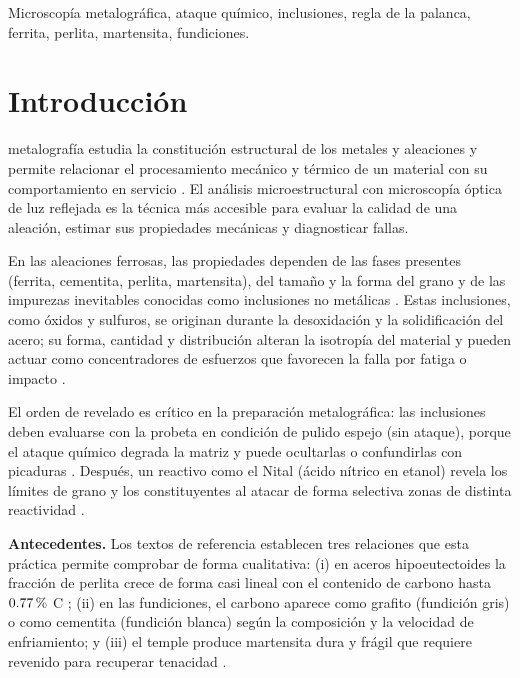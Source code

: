 \documentclass[journal,11pt]{IEEEtran}
\newcommand{\pct}{\ifmmode\mskip\thinmuskip\mathchar"0025\relax\else\,\char37\relax\fi}
\begin{document}
\begin{IEEEkeywords}
Microscopía metalográfica, ataque químico, inclusiones, regla de la palanca, ferrita, perlita, martensita, fundiciones.
\end{IEEEkeywords}

\section{Introducción}
 metalografía estudia la constitución estructural de los metales y aleaciones y permite relacionar el procesamiento mecánico y térmico de un material con su comportamiento en servicio \cite{smith}. El análisis microestructural con microscopía óptica de luz reflejada es la técnica más accesible para evaluar la calidad de una aleación, estimar sus propiedades mecánicas y diagnosticar fallas.

En las aleaciones ferrosas, las propiedades dependen de las fases presentes (ferrita, cementita, perlita, martensita), del tamaño y la forma del grano y de las impurezas inevitables conocidas como inclusiones no metálicas \cite{callister}. Estas inclusiones, como óxidos y sulfuros, se originan durante la desoxidación y la solidificación del acero; su forma, cantidad y distribución alteran la isotropía del material y pueden actuar como concentradores de esfuerzos que favorecen la falla por fatiga o impacto \cite{ashby2}.

El orden de revelado es crítico en la preparación metalográfica: las inclusiones deben evaluarse con la probeta en condición de pulido espejo (sin ataque), porque el ataque químico degrada la matriz y puede ocultarlas o confundirlas con picaduras \cite{shackelford,astm_e3}. Después, un reactivo como el Nital (ácido nítrico en etanol) revela los límites de grano y los constituyentes al atacar de forma selectiva zonas de distinta reactividad \cite{astm_e407}.

\textbf{Antecedentes.} Los textos de referencia establecen tres relaciones que esta práctica permite comprobar de forma cualitativa: (i) en aceros hipoeutectoides la fracción de perlita crece de forma casi lineal con el contenido de carbono hasta $0.77\pct$ C \cite{callister}; (ii) en las fundiciones, el carbono aparece como grafito (fundición gris) o como cementita (fundición blanca) según la composición y la velocidad de enfriamiento; y (iii) el temple produce martensita dura y frágil que requiere revenido para recuperar tenacidad \cite{callister,asm9}.
\end{document}
